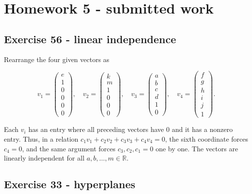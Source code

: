 \section{Homework 5 - submitted work}

\subsection{Exercise 56 - linear independence}

Rearrange the four given vectors as

\[v_{1} = \begin{pmatrix}
e \\
1 \\
0 \\
0 \\
0 \\
0
\end{pmatrix},\quad v_{2} = \begin{pmatrix}
k \\
m \\
1 \\
0 \\
0 \\
0
\end{pmatrix},\quad v_{3} = \begin{pmatrix}
a \\
b \\
c \\
d \\
1 \\
0
\end{pmatrix},\quad v_{4} = \begin{pmatrix}
f \\
g \\
h \\
i \\
j \\
1
\end{pmatrix}.\]

Each \(v_{i}\) has an entry where all preceding vectors have \(0\) and it has a nonzero entry. Thus, in a relation \(c_{1}v_{1} + c_{2}v_{2} + c_{3}v_{3} + c_{4}v_{4} = 0\), the sixth coordinate forces \(c_{4} = 0\), and the same argument forces \(c_{3},c_{2},c_{1} = 0\) one by one. The vectors are linearly independent for all \(a,b,\ldots,m \in \mathbb{R}\).

\subsection{Exercise 33 - hyperplanes}

